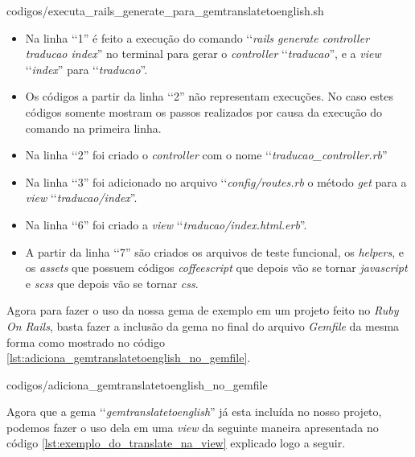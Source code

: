 
{codigos/executa_rails_generate_para_gemtranslatetoenglish.sh} 

\begin{itemize}

 \item Na linha ‘‘1'' é feito a execução do comando ‘‘\emph{rails generate controller traducao index}'' no 
 terminal para gerar o \emph{controller} ‘‘\emph{traducao}'', e a \emph{view} ‘‘\emph{index}'' para 
 ‘‘\emph{traducao}''.

 \item Os códigos a partir da linha ‘‘2'' não representam execuções. No caso estes códigos somente 
 mostram os passos realizados por causa da execução do comando na primeira linha.
 
 \item Na linha ‘‘2'' foi criado o \emph{controller} com o nome ‘‘\emph{traducao\_controller.rb}''
 
 \item Na linha ‘‘3'' foi adicionado no arquivo ‘‘\emph{config/routes.rb} o método \emph{get} para a 
 \emph{view} ‘‘\emph{traducao/index}''.
 
 \item Na linha ‘‘6'' foi criado a \emph{view} ‘‘\emph{traducao/index.html.erb}''.
 
 \item A partir da linha ‘‘7'' são criados os arquivos de teste funcional, os \emph{helpers}, e os 
 \emph{assets} que possuem códigos \emph{coffeescript} que depois vão se tornar \emph{javascript} e 
 \emph{scss} que depois vão se tornar \emph{css}.
 
\end{itemize}


Agora para fazer o uso da nossa gema de exemplo em um projeto feito no \emph{Ruby On Rails}, basta fazer a 
inclusão da gema no final do arquivo \emph{Gemfile} da mesma forma como mostrado no código 
\ref{lst:adiciona_gemtranslatetoenglish_no_gemfile}.
 
 
{codigos/adiciona_gemtranslatetoenglish_no_gemfile}
 
Agora que a gema ‘‘\emph{gemtranslatetoenglish}'' já esta incluída no nosso projeto, podemos fazer o uso 
dela em uma \emph{view} da seguinte maneira apresentada no código \ref{lst:exemplo_do_translate_na_view}
explicado logo a seguir.

